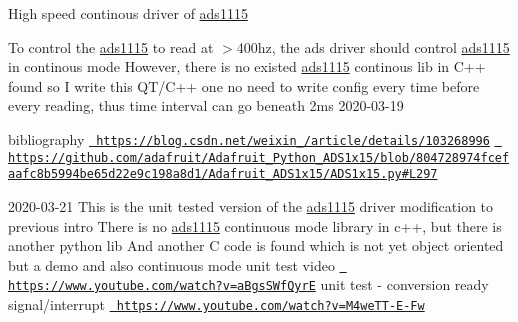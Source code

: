 High speed continous driver of \mbox{\hyperlink{classads1115}{ads1115}}

To control the \mbox{\hyperlink{classads1115}{ads1115}} to read at $>$400hz, the ads driver should control \mbox{\hyperlink{classads1115}{ads1115}} in continous mode However, there is no existed \mbox{\hyperlink{classads1115}{ads1115}} continous lib in C++ found so I write this Q\+T/\+C++ one no need to write config every time before every reading, thus time interval can go beneath 2ms 2020-\/03-\/19

bibliography \href{https://blog.csdn.net/weixin_45380951/article/details/103268996}{\texttt{ https\+://blog.\+csdn.\+net/weixin\+\_/article/details/103268996}} \href{https://github.com/adafruit/Adafruit_Python_ADS1x15/blob/804728974fcefaafc8b5994be65d22e9c198a8d1/Adafruit_ADS1x15/ADS1x15.py\#L297}{\texttt{ https\+://github.\+com/adafruit/\+Adafruit\+\_\+\+Python\+\_\+\+A\+D\+S1x15/blob/804728974fcefaafc8b5994be65d22e9c198a8d1/\+Adafruit\+\_\+\+A\+D\+S1x15/\+A\+D\+S1x15.\+py\#\+L297}}

2020-\/03-\/21 This is the unit tested version of the \mbox{\hyperlink{classads1115}{ads1115}} driver modification to previous intro There is no \mbox{\hyperlink{classads1115}{ads1115}} continuous mode library in c++, but there is another python lib And another C code is found which is not yet object oriented but a demo and also continuous mode unit test video \href{https://www.youtube.com/watch?v=aBgsSWfQyrE}{\texttt{ https\+://www.\+youtube.\+com/watch?v=a\+Bgs\+S\+Wf\+QyrE}} unit test -\/ conversion ready signal/interrupt \href{https://www.youtube.com/watch?v=M4weTT-E-Fw}{\texttt{ https\+://www.\+youtube.\+com/watch?v=\+M4we\+T\+T-\/\+E-\/\+Fw}} 